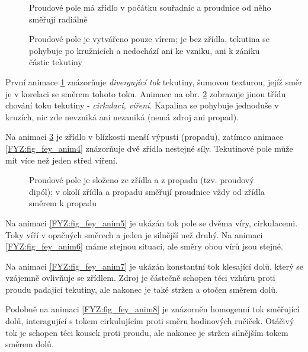     \begin{figure}[ht!]
      \centering
      \caption{Proudové pole má zřídlo v počátku souřadnic a proudnice od něho směřují radiálně} 
      \label{FYZ:fig_fey_anim1}
    \end{figure}

    \begin{figure}[ht!]
      \centering 
      \caption{Proudové pole je vytvářeno pouze vírem; je bez zřídla, tekutina se pohybuje po 
               kružnicích a nedochází ani ke vzniku, ani k zániku částic tekutiny} 
      \label{FYZ:fig_fey_anim2}
    \end{figure}
    
    První animace \ref{FYZ:fig_fey_anim1} znázorňuje \emph{divergující tok} tekutiny, šumovou 
    texturou, jejíž směr je v korelaci se směrem tohoto toku. Animace na obr. 
    \ref{FYZ:fig_fey_anim2} zobrazuje jinou třídu chování toku tekutiny  - \emph{cirkulaci, 
    víření}. Kapalina se pohybuje jednoduše v kruzích, nic zde nevzniká ani nezaniká (nemá zdroj 
    ani propad).   

    Na animaci \ref{FYZ:fig_fey_anim3} je zřídlo v blízkosti menší výpusti (propadu), zatímco 
    animace \ref{FYZ:fig_fey_anim4} znázorňuje dvě zřídla nestejné síly. Tekutinové pole může mít 
    více než jeden střed víření. 

    \begin{figure}[ht!]
      \centering
      \caption{Proudové pole je složeno ze zřídla a z propadu (tzv. proudový dipól); v okolí 
               zřídla a propadu směřují proudnice vždy od zřídla směrem k propadu}
      \label{FYZ:fig_fey_anim3}
    \end{figure}

    Na animaci \ref{FYZ:fig_fey_anim5} je ukázán tok pole se dvěma víry, cirkulacemi. Toky víří v 
    opačných směrech a jeden je silnější než druhý. Na animaci \ref{FYZ:fig_fey_anim6} máme stejnou 
    situaci, ale směry obou vírů jsou stejné.    
    
    Na animaci \ref{FYZ:fig_fey_anim7} je ukázán konstantní tok klesající dolů, který se vzájemně 
    ovlivňuje se zřídlem. Zdroj je částečně schopen téci vzhůru proti proudu padající tekutiny, ale 
    nakonec je také stržen a otočen směrem dolů.
    
    Podobně na animaci \ref{FYZ:fig_fey_anim8} je znázorněn homogenní tok směřující dolů, 
    interagující s tokem cirkulujícím proti směru hodinových ručiček. Otáčivý tok je schopen téci 
    kousek proti proudu, ale nakonec je stržen silnějším tokem směrem dolů.

